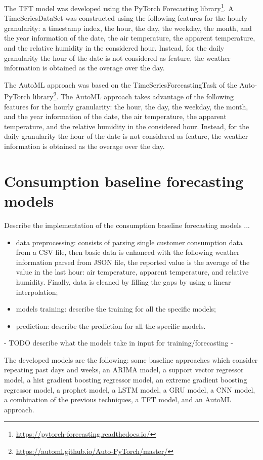 The TFT model was developed using the PyTorch Forecasting library\footnote{ \url{https://pytorch-forecasting.readthedocs.io/} }.
A TimeSeriesDataSet was constructed using the following features for the hourly granularity: a timestamp index, the hour, the day, the weekday, the month, and the year information of the date, the air temperature, the apparent temperature, and the relative humidity in the considered hour.
Instead, for the daily granularity the hour of the date is not considered as feature, the weather information is obtained as the overage over the day.

The AutoML approach was based on the TimeSeriesForecastingTask of the Auto-PyTorch library\footnote{ \url{https://automl.github.io/Auto-PyTorch/master/} }.
The AutoML approach takes advantage of the following features for the hourly granularity: the hour, the day, the weekday, the month, and the year information of the date, the air temperature, the apparent temperature, and the relative humidity in the considered hour.
Instead, for the daily granularity the hour of the date is not considered as feature, the weather information is obtained as the overage over the day.


\section{Consumption baseline forecasting models}
\label{sec:baselineimpl}
\vspace{0.2 cm}

Describe the implementation of the consumption baseline forecasting models ...
\begin{itemize}
  \item data preprocessing: consists of parsing single customer consumption data from a CSV file, then basic data is enhanced with the following weather information parsed from JSON file, the reported value is the average of the value in the last hour: air temperature, apparent temperature, and relative humidity. Finally, data is cleaned by filling the gaps by using a linear interpolation;
  \item models training: describe the training for all the specific models;
  \item prediction: describe the prediction for all the specific models.
\end{itemize}


 - TODO describe what the models take in input for training/forecasting -


The developed models are the following: some baseline approaches which consider repeating past days and weeks, an ARIMA model, a support vector regressor model, a hist gradient boosting regressor model, an extreme gradient boosting regressor model, a prophet model, a LSTM model, a GRU model, a CNN model, a combination of the previous techniques, a TFT model, and an AutoML approach.

